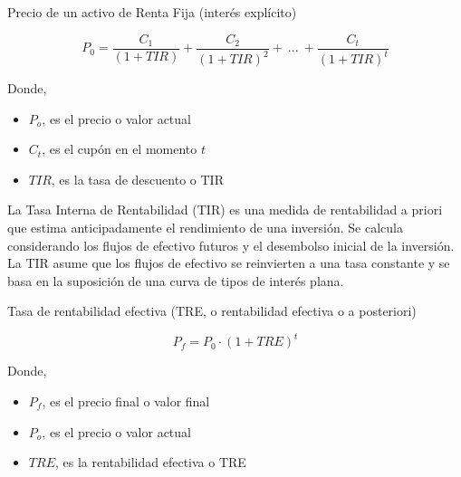 \documentclass[
  letterpaper,
  DIV=11,
  numbers=noendperiod]{scrreprt}
\begin{document}
\begin{tcolorbox}
\begin{tcolorbox}[enhanced jigsaw, toprule=.15mm, left=2mm, arc=.35mm, breakable, bottomrule=.15mm, opacityback=0, rightrule=.15mm, leftrule=.75mm, colframe=quarto-callout-note-color-frame, colback=white]
\begin{minipage}[t]{\textwidth - 5.5mm}
Precio de un activo de Renta Fija (interés explícito)

\[P_0=\frac{C_1}{(1+TIR)}+\frac{C_2}{(1+TIR)^2}+\ ... \ +\frac{C_t}{(1+TIR)^t}\]

Donde,

\begin{itemize}
\item
  \(P_o\), es el precio o valor actual
\item
  \(C_t\), es el cupón en el momento \(t\)
\item
  \(TIR\), es la tasa de descuento o TIR
\end{itemize}

\end{minipage}%
\end{tcolorbox}

La Tasa Interna de Rentabilidad (TIR) es una medida de rentabilidad a
priori que estima anticipadamente el rendimiento de una inversión. Se
calcula considerando los flujos de efectivo futuros y el desembolso
inicial de la inversión. La TIR asume que los flujos de efectivo se
reinvierten a una tasa constante y se basa en la suposición de una curva
de tipos de interés plana.

\begin{tcolorbox}[enhanced jigsaw, toprule=.15mm, left=2mm, arc=.35mm, breakable, bottomrule=.15mm, opacityback=0, rightrule=.15mm, leftrule=.75mm, colframe=quarto-callout-note-color-frame, colback=white]
\begin{minipage}[t]{5.5mm}
\textcolor{quarto-callout-note-color}{\faInfo}
\end{minipage}%
\begin{minipage}[t]{\textwidth - 5.5mm}

Tasa de rentabilidad efectiva (TRE, o rentabilidad efectiva o a
posteriori)

\[P_f=P_0 \cdot \left(1+{TRE}\right)^t\]

Donde,

\begin{itemize}
\item
  \(P_f\), es el precio final o valor final
\item
  \(P_o\), es el precio o valor actual
\item
  \(TRE\), es la rentabilidad efectiva o TRE
\end{itemize}

\end{minipage}%
\end{tcolorbox}


\end{tcolorbox}
\end{document}
